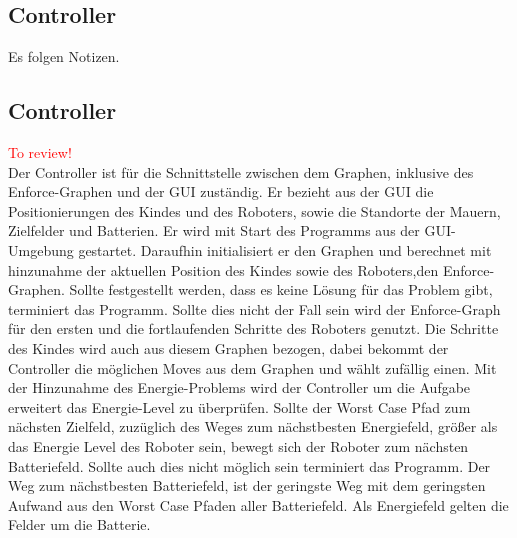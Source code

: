 \subsection{Controller}
Es folgen Notizen.
\subsection{Controller}\textcolor{red}{To review!}\\
Der Controller ist für die Schnittstelle zwischen dem Graphen, inklusive des Enforce-Graphen und der GUI zuständig. Er bezieht aus der GUI die Positionierungen des Kindes und des Roboters, sowie die Standorte der Mauern, Zielfelder und Batterien. Er wird mit Start des Programms aus der GUI-Umgebung gestartet. Daraufhin initialisiert er den Graphen und berechnet mit hinzunahme der aktuellen Position des Kindes sowie des Roboters,den Enforce-Graphen. Sollte festgestellt werden, dass es keine Lösung für das Problem gibt, terminiert das Programm. Sollte dies nicht der Fall sein wird der Enforce-Graph für den ersten und die fortlaufenden Schritte des Roboters genutzt. Die Schritte des Kindes wird auch aus diesem Graphen bezogen, dabei bekommt der Controller die möglichen Moves aus dem Graphen und wählt zufällig einen. Mit der Hinzunahme des Energie-Problems wird der Controller um die Aufgabe erweitert das Energie-Level zu überprüfen. Sollte der Worst Case Pfad zum nächsten Zielfeld, zuzüglich des Weges zum nächstbesten Energiefeld, größer als das Energie Level des Roboter sein, bewegt sich der Roboter zum nächsten Batteriefeld. Sollte auch dies nicht möglich sein terminiert das Programm. Der Weg zum nächstbesten Batteriefeld, ist der geringste Weg mit dem geringsten Aufwand aus den Worst Case Pfaden aller Batteriefeld. Als Energiefeld gelten die Felder um die Batterie.


%
